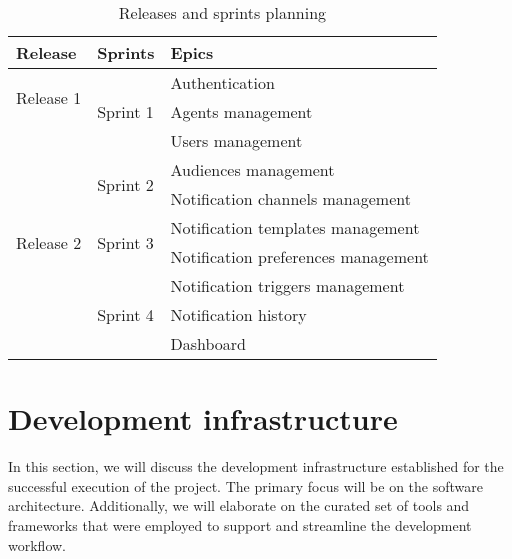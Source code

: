 \begin{table}[hbt!]
      \begin{tabular}{ | m{} | m{} | m{} | }
            \hline
            \textbf{Release}             & \textbf{Sprints}            & \textbf{Epics}                      \\
            \hline
            \multirow{2}{5em}{Release 1}
                                         & \multirow{3}{5em}{Sprint 1} & Authentication                      \\
            \cline{3-3}
                                         &                             & Agents management                   \\
            \cline{3-3}
                                         &                             & Users management                    \\
            \cline{2-3}

                                         & \multirow{2}{5em}{Sprint 2} & Audiences management                \\
            \cline{3-3}
                                         &                             & Notification channels management    \\
            \hline
            \multirow{2}{5em}{Release 2} & \multirow{2}{5em}{Sprint 3} & Notification templates management   \\
            \cline{3-3}
                                         &                             & Notification preferences management \\
            \cline{2-3}
                                         & \multirow{3}{5em}{Sprint 4} & Notification triggers management    \\
            \cline{3-3}
                                         &                             & Notification history                \\
            \cline{3-3}
                                         &                             & Dashboard                           \\
            \hline
      \end{tabular}
      \caption{Releases and sprints planning}
      \label{tab:planning}
\end{table}

\section{Development infrastructure}
In this section, we will discuss the development infrastructure established for the successful execution
of the project. The primary focus will be on the software architecture. Additionally, we will elaborate
on the curated set of tools and frameworks that were employed to support and streamline the development
workflow.


